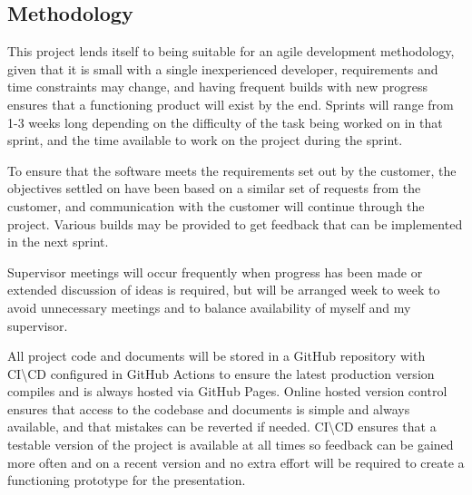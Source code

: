 \subsection{Methodology}
This project lends itself to being suitable for an agile development methodology, given that it is small with a single inexperienced developer, requirements and time constraints may change, and having frequent builds with new progress ensures that a functioning product will exist by the end. Sprints will range from 1-3 weeks long depending on the difficulty of the task being worked on in that sprint, and the time available to work on the project during the sprint. 

To ensure that the software meets the requirements set out by the customer, the objectives settled on have been based on a similar set of requests from the customer, and communication with the customer will continue through the project. Various builds may be provided to get feedback that can be implemented in the next sprint.

Supervisor meetings will occur frequently when progress has been made or extended discussion of ideas is required, but will be arranged week to week to avoid unnecessary meetings and to balance availability of myself and my supervisor.

All project code and documents will be stored in a GitHub repository with CI\textbackslash CD configured in GitHub Actions to ensure the latest production version compiles and is always hosted via GitHub Pages. Online hosted version control ensures that access to the codebase and documents is simple and always available, and that mistakes can be reverted if needed. CI\textbackslash CD ensures that a testable version of the project is available at all times so feedback can be gained more often and on a recent version and no extra effort will be required to create a functioning prototype for the presentation.

